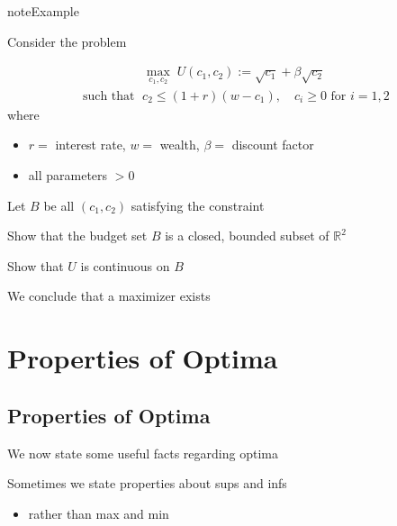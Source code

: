 \documentclass[letterpaper,10pt,english]{jupyterBook}
\begin{document}
\begin{sphinxadmonition}{note}{Example}

\sphinxAtStartPar
Consider the problem
\end{sphinxadmonition}
\begin{equation*}
\begin{split} 
%
\max_{c_1, c_2} \; U(c_1, c_2) := \sqrt{c_1} + \beta \sqrt{c_2} 
%
\end{split}
\end{equation*}\begin{equation*}
\begin{split}
%
\text{ such that } \; c_2 \leq (1 + r)(w - c_1), 
\quad c_i \geq 0 \text{ for } i = 1,2
%
\end{split}
\end{equation*}
\sphinxAtStartPar
where
\begin{itemize}
\item {} 
\sphinxAtStartPar
\(r=\) interest rate, \(w=\) wealth, \(\beta=\) discount factor

\item {} 
\sphinxAtStartPar
all parameters \(> 0\)

\end{itemize}

\sphinxAtStartPar
Let \(B\) be all \((c_1, c_2)\) satisfying the constraint

\sphinxAtStartPar
{} Show that the budget set \(B\) is a closed, bounded subset of \(\mathbb{R}^2\)

\sphinxAtStartPar
{} Show that \(U\) is continuous on \(B\)

\sphinxAtStartPar
We conclude that a maximizer exists


\section{Properties of Optima}
\label{\detokenize{06.optimization_fundamentals:properties-of-optima}}

\subsection{Properties of Optima}
\label{\detokenize{06.optimization_fundamentals:id3}}
\sphinxAtStartPar
We now state some useful facts regarding optima

\sphinxAtStartPar
Sometimes we state properties about sups and infs
\begin{itemize}
\item {} 
\sphinxAtStartPar
rather than max and min

\end{itemize}
\end{document}
